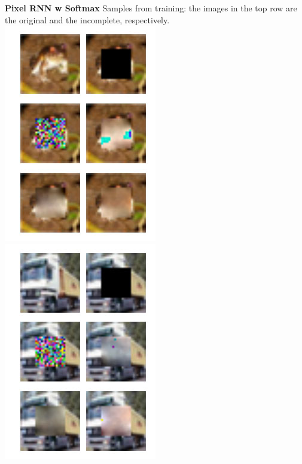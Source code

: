 \documentclass[10pt,twocolumn,letterpaper]{article}
\begin{document}
\textbf{Pixel RNN w Softmax}
Samples from training: the images in the top row are the original and the incomplete, respectively. \\
\includegraphics[width=0.8\linewidth]{baseline_train_frog.jpg} 
\includegraphics[width=0.8\linewidth]{baseline_train_truck.jpg} 
\end{document}
